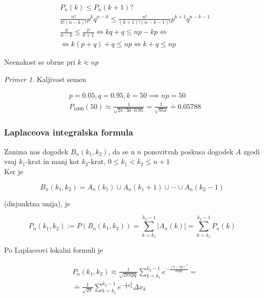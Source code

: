 \documentclass[a4paper,12pt]{article}
\theoremstyle{definition}
\theoremstyle{remark}
\newtheorem*{ex}{Primer}
\begin{document}
\begin{align*}
    &P_n(k) \leq P_n(k+1)\text{?} \\
    &\frac{n!}{k!(n-k)!} p^k q^{n-k} \leq \frac{n!}{(k+1)!(n-k-1)!} p^{k+1} q^{n-k-1} \\
    &\frac{q}{n-k} \leq \frac{p}{k+1} \iff kq + q \leq np - kp \iff \\
    &\iff k(p+q) + q \leq np \iff k + q \leq np
\end{align*}

Neenakost se obrne pri $k \approx np$

\begin{ex}
    Kaljivost semen

    \begin{align*}
        &p = 0.05, q = 0.95, k = 50 \implies np = 50 \\
        &P_{1000}(50) \approx \frac{1}{\sqrt{2 \pi \cdot 50 \cdot 0.95}} = \frac{1}{\sqrt{95\pi}}
            \doteq 0.05788
    \end{align*}
\end{ex}

\subsubsection{Laplaceova integralska formula}

Zanima nas dogodek $B_n(k_1, k_2)$, da se n $n$ ponovitvah poskusa dogodek $A$ zgodi vsaj $k_1$-krat in manj kot
$k_2$-krat, $0 \leq k_1 < k_2 \leq n+1$ \\
Ker je 

\begin{equation*}
    B_n(k_1, k_2) = A_n(k_1) \cup A_n(k_1+1) \cup \cdots \cup A_n(k_2-1)
\end{equation*}

(disjunktna unija), je

\begin{equation*}
    P_n(k_1, k_2) := P(B_n(k_1, k_2)) = \sum_{k=k_1}^{k_2-1} |A_n(k)| = \sum_{k=k_1}^{k_2-1} P_n(k)
\end{equation*}

Po Laplaceovi lokalni formuli je

\begin{align*}
    &P_n(k_1, k_2) \approx \frac{1}{\sqrt{2\pi npq}} \sum_{k=k_1}^{k_2-1} e^{-\frac{(k-nq)^2}{2npq}} = \\
    &\doteq \frac{1}{\sqrt{2\pi}} \sum_{k=k_1}^{k_2-1} e^{-\frac{1}{2} x_k^2} \Delta x_k
\end{align*}
\end{document}
